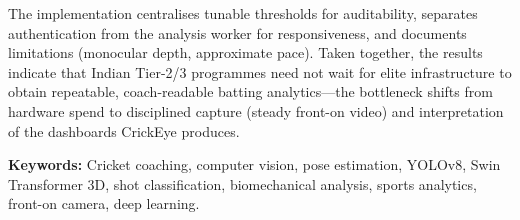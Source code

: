 \par The implementation centralises tunable thresholds for auditability, separates authentication from the analysis worker for responsiveness, and documents limitations (monocular depth, approximate pace). Taken together, the results indicate that Indian Tier-2/3 programmes need not wait for elite infrastructure to obtain repeatable, coach-readable batting analytics---the bottleneck shifts from hardware spend to disciplined capture (steady front-on video) and interpretation of the dashboards CrickEye produces.

\par \textbf{Keywords:} Cricket coaching, computer vision, pose estimation, YOLOv8, Swin Transformer 3D, shot classification, biomechanical analysis, sports analytics, front-on camera, deep learning.
